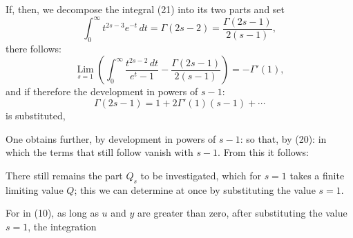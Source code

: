 
If, then, we decompose the integral (21) into its two parts and set
\[
\int_0^\infty t^{2s-3}e^{-t}\,dt = \Gamma(2s-2) = \frac{\Gamma(2s-1)}{2(s-1)},
\]
there follows:
\[
\mathop{\mathrm{Lim}}\limits_{s=1}\left(\int_0^\infty \frac{t^{2s-2}\,dt}{e^t-1} - \frac{\Gamma(2s-1)}{2(s-1)}\right) = -\Gamma'(1),
\]
and if therefore the development in powers of $s-1$:
\[
\Gamma(2s-1) = 1 + 2\Gamma'(1)(s-1) + \cdots
\]
is substituted,

One obtains further, by development in powers of $s-1$:
so that, by (20):
in which the terms that still follow vanish with $s-1$. From this it follows:

There still remains the part $Q_s$ to be investigated, which for $s=1$ takes a finite limiting value $Q$; this we can determine at once by substituting the value $s=1$.

For in (10), as long as $u$ and $y$ are greater than zero, after substituting the value $s=1$, the integration
